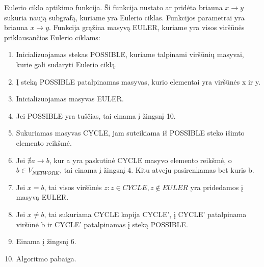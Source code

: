 Eulerio ciklo aptikimo funkcija. Ši funkcija nustato ar pridėta briauna $x \rightarrow y$ sukuria naują subgrafą, kuriame yra Eulerio ciklas. Funkcijos parametrai yra briauna $x \rightarrow y$. Funkcija grąžina masyvą EULER, kuriame yra visos viršūnės priklausančios Eulerio ciklams:
\begin{enumerate}
	\item Inicializuojamas stekas POSSIBLE, kuriame talpinami viršūnių masyvai, kurie gali sudaryti Eulerio ciklą.
	\item Į steką POSSIBLE patalpinamas masyvas, kurio elementai yra viršūnės x ir y.
	\item Inicializuojamas masyvas EULER.
	\item Jei POSSIBLE yra tuščias, tai einama į žingsnį 10.
	\item Sukuriamas masyvas CYCLE, jam suteikiama iš POSSIBLE steko išimto elemento reikšmė.
	\item Jei $\nexists a \rightarrow b$, kur a yra paskutinė CYCLE masyvo elemento reikšmė, o $b \in V_{NETWORK}$, tai einama į žingsnį 4. Kitu atveju pasirenkamas bet kuris b.
	\item Jei $x = b$, tai visos viršūnės $z : z \in CYCLE, z \notin EULER$ yra pridedamos į masyvą EULER.
	\item Jei $x \neq b$, tai sukuriama CYCLE kopija CYCLE', į CYCLE' patalpinama viršūnė b ir CYCLE' patalpinamas į steką POSSIBLE.
	\item Einama į žingsnį 6.
	\item Algoritmo pabaiga. 
\end{enumerate}

